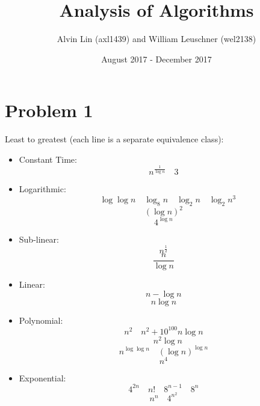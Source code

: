 \documentclass[letterpaper, 12pt]{math}
\title{Analysis of Algorithms}
\author{Alvin Lin (axl1439) and William Leuschner (wel2138)}
\date{August 2017 - December 2017}
\begin{document}
\maketitle

\section*{Problem 1}
Least to greatest (each line is a separate equivalence class):
\begin{itemize}
  \item Constant Time:
  \[ n^{\frac{1}{\log n}} \quad 3 \]
  \item Logarithmic:
  \[ \quad \log\log n \quad \log_8 n \quad \log_2 n \quad \log_2 n^3 \]
  \[ (\log n)^2 \]
  \[ 4^{\log n} \]
  \item Sub-linear:
  \[ n^{\frac{1}{2}} \]
  \[ \frac{n}{\log n} \]
  \item Linear:
  \[ n-\log n \]
  \[ n\log n \]
  \item Polynomial:
  \[ n^2 \quad n^2+10^{100}n\log n \]
  \[ \quad n^2\log n \]
  \[ n^{\log\log n} \quad (\log n)^{\log n} \]
  \[ n^4 \]
  \item Exponential:
  \[ 4^{2n} \quad n! \quad 8^{n-1} \quad 8^n \]
  \[ n^n\quad 4^{n^2} \]
\end{itemize}
\end{document}

